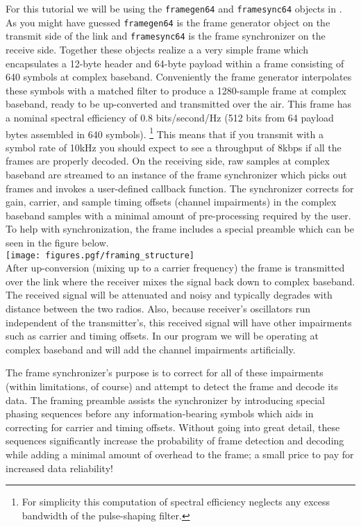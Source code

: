 For this tutorial we will be using the {\tt framegen64} and
{\tt framesync64} objects in \liquid.
As you might have guessed {\tt framegen64} is the frame generator object
on the transmit side of the link
and {\tt framesync64} is the frame synchronizer on the receive side.
%
Together these objects realize a
a very simple frame which encapsulates a 12-byte header and 64-byte
payload within a frame consisting of 640 symbols at complex baseband.
Conveniently the frame generator interpolates these symbols with a
matched filter to produce a 1280-sample frame at complex baseband,
ready to be up-converted and transmitted over the air.
This frame has a nominal spectral efficiency of 0.8 bits/second/Hz
(512 bits from 64 payload bytes assembled in 640 symbols).%
\footnote{
    For simplicity this computation of spectral efficiency
    neglects any excess bandwidth of the pulse-shaping filter.}
This means that if you transmit with a symbol rate of 10kHz you should
expect to see a throughput of 8kbps if all the frames are properly
decoded.
On the receiving side,
raw samples at complex baseband are streamed to an instance of
the frame synchronizer which picks out frames and invokes a user-defined
callback function.
The synchronizer corrects for gain, carrier, and sample timing offsets
(channel impairments) in the complex baseband samples with a minimal
amount of pre-processing required by the user.
%
To help with synchronization, the frame includes a special preamble
which can be seen in the figure below.\\
%
\texttt{[image: figures.pgf/framing\_structure]}\\
%
After up-conversion (mixing up to a carrier frequency) the frame is
transmitted over the link where the receiver mixes the signal back down to
complex baseband.
The received signal will be attenuated and noisy and typically degrades
with distance between the two radios.
Also, because receiver's oscillators run independent of the
transmitter's,
this received signal will have other impairments such as carrier
and timing offsets.
In our program we will be operating at complex baseband and will add the
channel impairments artificially.

The frame synchronizer's purpose is to correct for all of these
impairments (within limitations, of course) and attempt to detect the
frame and decode its data.
The framing preamble assists the synchronizer by introducing special
phasing sequences before any information-bearing symbols which aids in
correcting for carrier and timing offsets.
Without going into great detail, these sequences significantly increase
the probability of frame detection and decoding while adding a minimal
amount of overhead to the frame;
a small price to pay for increased data reliability!


